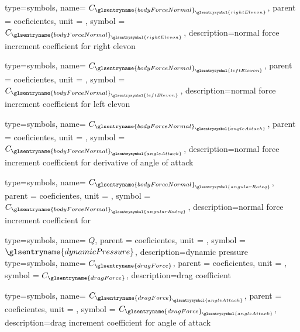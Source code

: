 {type=symbols,
    name= \ensuremath{C_{{\glsentryname{bodyForceNormal}}_{\glsentrysymbol{rightElevon}}}},
    parent = {coeficientes},
    unit = \unexpanded{},
    symbol = \ensuremath{C_{{\glsentryname{bodyForceNormal}}_{\glsentrysymbol{rightElevon}}}},
    description={normal force increment coefficient for right elevon}
}

{type=symbols,
    name= \ensuremath{C_{{\glsentryname{bodyForceNormal}}_{\glsentrysymbol{leftElevon}}}},
    parent = {coeficientes},
    unit = \unexpanded{},
    symbol = \ensuremath{C_{{\glsentryname{bodyForceNormal}}_{\glsentrysymbol{leftElevon}}}},
    description={normal force increment coefficient for left elevon}
}

{type=symbols,
    name= \ensuremath{C_{{\glsentryname{bodyForceNormal}}_{\dot{\glsentrysymbol{angleAttack}}}}},
    parent = {coeficientes},
    unit = \unexpanded{},
    symbol = \ensuremath{C_{{\glsentryname{bodyForceNormal}}_{\dot{\glsentrysymbol{angleAttack}}}}},
    description={normal force increment coefficient for derivative of angle of attack}
}

{type=symbols,
    name= \ensuremath{C_{{\glsentryname{bodyForceNormal}}_{\glsentrysymbol{angularRateq}}}},
    parent = {coeficientes},
    unit = \unexpanded{},
    symbol = \ensuremath{C_{{\glsentryname{bodyForceNormal}}_{\glsentrysymbol{angularRateq}}}},
    description={normal force increment coefficient for }
}






{type=symbols,
    name= \ensuremath{Q},
    parent = {coeficientes},
    unit = \unexpanded{\si{\newton\per\cubic\meter}},
    symbol = \ensuremath{\glsentryname{dynamicPressure}},
    description={dynamic pressure}
}
{type=symbols,
    name= \ensuremath{C_{\glsentryname{dragForce}}},
    parent = {coeficientes},
    unit = \unexpanded{},
    symbol = \ensuremath{C_{\glsentryname{dragForce}}},
    description={drag coefficient}
}

{type=symbols,
    name= \ensuremath{C_{{\glsentryname{dragForce}}_{\glsentrysymbol{angleAttack}}}},
    parent = {coeficientes},
    unit = \unexpanded{},
    symbol = \ensuremath{C_{{\glsentryname{dragForce}}_{\glsentrysymbol{angleAttack}}}},
    description={drag increment coefficient for angle of attack}
}


